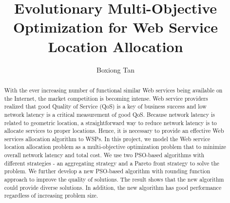 \documentclass[11pt
              , a4paper
              , twoside
              , openright
              ]{report}
\title{Evolutionary Multi-Objective Optimization for Web Service Location Allocation}
\author{Boxiong Tan}
\date{}
\begin{document}
\frontmatter



\begin{abstract}
With the ever increasing number of functional similar Web services being available on the Internet, 
the market competition is becoming intense. 
Web service providers realized that good Quality of Service (QoS) is a key of business success
and low network latency is a critical measurement of good QoS.
Because network latency is related to geometric location,
a straightforward way to reduce network latency is to allocate services to proper locations. 
Hence, it is necessary to provide an effective Web services allocation algorithm to WSPs. 
In this project, we model the Web service location allocation 
problem as a multi-objective optimization problem that to minimize overall network latency and total cost. 
We use two PSO-based algorithms with different strategies - an aggregating strategy and a Pareto front 
strategy to solve the problem. We further develop a new PSO-based algorithm with rounding function approach to improve the quality of solutions. 
The result shows that the new algorithm could provide diverse solutions. In addition, the new algorithm has good 
performance regardless of increasing problem size.

\end{abstract}


\maketitle


\tableofcontents



\mainmatter




% 
 



\backmatter



%


\end{document}
